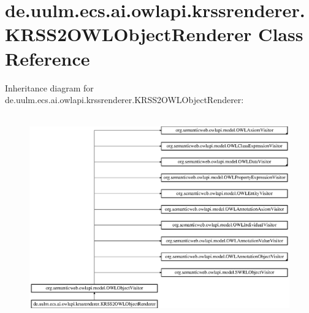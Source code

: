 \hypertarget{classde_1_1uulm_1_1ecs_1_1ai_1_1owlapi_1_1krssrenderer_1_1_k_r_s_s2_o_w_l_object_renderer}{\section{de.\-uulm.\-ecs.\-ai.\-owlapi.\-krssrenderer.\-K\-R\-S\-S2\-O\-W\-L\-Object\-Renderer Class Reference}
\label{classde_1_1uulm_1_1ecs_1_1ai_1_1owlapi_1_1krssrenderer_1_1_k_r_s_s2_o_w_l_object_renderer}
}
Inheritance diagram for de.\-uulm.\-ecs.\-ai.\-owlapi.\-krssrenderer.\-K\-R\-S\-S2\-O\-W\-L\-Object\-Renderer\-:\begin{figure}[H]
\begin{center}
\leavevmode
\includegraphics[height=8.842105cm]{classde_1_1uulm_1_1ecs_1_1ai_1_1owlapi_1_1krssrenderer_1_1_k_r_s_s2_o_w_l_object_renderer}
\end{center}
\end{figure}
